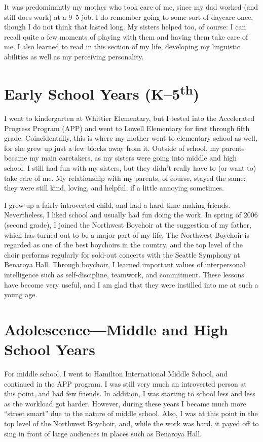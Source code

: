 \documentclass[12pt, letter]{article}
\renewcommand{\ss}[2]{#1\textsuperscript{#2}}
\begin{document}
	It was predominantly my mother who took care of me, since my dad worked (and still does work) at a 9--5 job. I do remember going to some sort of daycare once, though I do not think that lasted long. My sisters helped too, of course: I can recall quite a few moments of playing with them and having them take care of me. I also learned to read in this section of my life, developing my linguistic abilities as well as my perceiving personality.
	
	\section*{Early School Years (K--\ss{5}{th})}
	
	I went to kindergarten at Whittier Elementary, but I tested into the Accelerated Progress Program (APP) and went to Lowell Elementary for first through fifth grade. Coincidentally, this is where my mother went to elementary school as well, for she grew up just a few blocks away from it. Outside of school, my parents became my main caretakers, as my sisters were going into middle and high school. I still had fun with my sisters, but they didn't really have to (or want to) take care of me. My relationship with my parents, of course, stayed the same: they were still kind, loving, and helpful, if a little annoying sometimes.
	
	I grew up a fairly introverted child, and had a hard time making friends. Nevertheless, I liked school and usually had fun doing the work. In spring of 2006 (second grade), I joined the Northwest Boychoir at the suggestion of my father, which has turned out to be a major part of my life. The Northwest Boychoir is regarded as one of the best boychoirs in the country, and the top level of the choir performs regularly for sold-out concerts with the Seattle Symphony at Benaroya Hall. Through boychoir, I learned important values of interpersonal intelligence such as self-discipline, teamwork, and commitment. These lessons have become very useful, and I am glad that they were instilled into me at such a young age.
	
	\section*{Adolescence---Middle and High School Years}
	
	For middle school, I went to Hamilton International Middle School, and continued in the APP program. I was still very much an introverted person at this point, and had few friends. In addition, I was starting to school less and less as the workload got harder. However, during these years I became much more ``street smart'' due to the nature of middle school. Also, I was at this point in the top level of the Northwest Boychoir, and, while the work was hard, it payed off to sing in front of large audiences in places such as Benaroya Hall. 	
	
\end{document}
